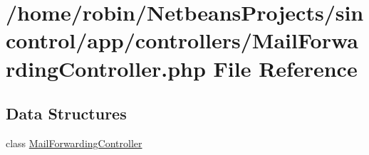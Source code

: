 \hypertarget{_mail_forwarding_controller_8php}{}\section{/home/robin/\+Netbeans\+Projects/sincontrol/app/controllers/\+Mail\+Forwarding\+Controller.php File Reference}
\label{_mail_forwarding_controller_8php}
\subsection*{Data Structures}
\begin{DoxyCompactItemize}
\item 
class \hyperlink{class_mail_forwarding_controller}{Mail\+Forwarding\+Controller}
\end{DoxyCompactItemize}
